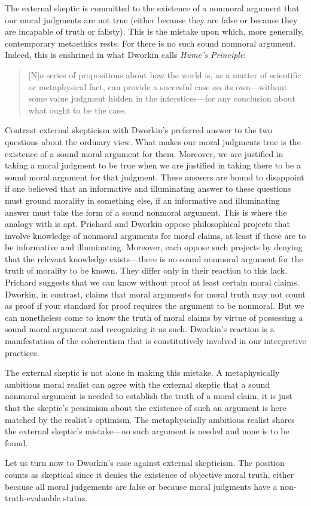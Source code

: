 \documentclass[12pt]{article}
\begin{document}
The external skeptic is committed to the existence of a nonmoral argument that our moral judgments are not true (either because they are false or because they are incapable of truth or falisty). This is the mistake upon which, more generally, contemporary metaethics rests. For there is no such sound nonmoral argument. Indeed, this is enshrined in what Dworkin calls \emph{Hume's Principle}: 
\begin{quote}
	[N]o series of propositions about how the world is, as a matter of scientific or metaphysical fact, can provide a succesful case on its own---without some value judgment hidden in the interstices---for any conclusion about what ought to be the case. \citep[44]{Dworkin:2011fk}
\end{quote}
Contrast external skepticism with Dworkin's preferred answer to the two questions about the ordinary view. What makes our moral judgments true is the existence of a sound moral argument for them. Moreover, we are justified in taking a moral judgment to be true when we are justified in taking there to be a sound moral argument for that judgment. These answers are bound to disappoint if one believed that an informative and illuminating answer to these questions must ground morality in something else, if an informative and illuminating answer must take the form of a sound nonmoral argument. This is where the analogy with \citet{Prichard:1912zm} is apt. Prichard and Dworkin oppose philosophical projects that involve knowledge of nonmoral arguments for moral claims, at least if these are to be informative and illuminating. Moreover, each oppose such projects by denying that the relevant knowledge exists---there is no sound nonmoral argument for the truth of morality to be known. They differ only in their reaction to this lack. Prichard suggests that we can know without proof at least certain moral claims. Dworkin, in contrast, claims that moral arguments for moral truth may not count as proof if your standard for proof requires the argument to be nonmoral. But we can nonetheless come to know the truth of moral claims by virtue of possessing a sound moral argument and recognizing it as such. Dworkin's reaction is a manifestation of the coherentism that is constitutively involved in our interpretive practices.

The external skeptic is not alone in making this mistake. A metaphysically ambitious moral realist can agree with the external skeptic that a sound nonmoral argument is needed to establish the truth of a moral claim, it is just that the skeptic's pessimism about the existence of such an argument is here matched by the realist's optimism. The metaphyscially ambitious realist shares the external skeptic's mistake---no such argument is needed and none is to be found.

Let us turn now to Dworkin's case against external skepticism. The position counts as skeptical since it denies the existence of objective moral truth, either because all moral judgements are false or because moral judgments have a non-truth-evaluable status.

 
 
\end{document}
